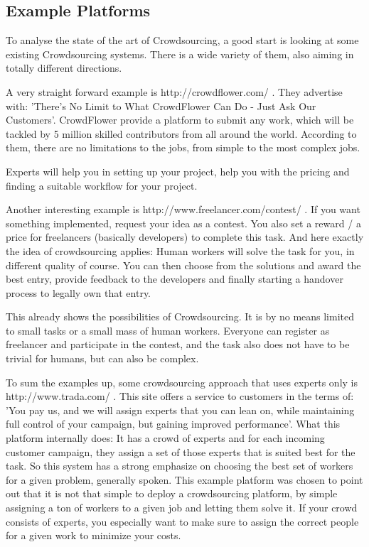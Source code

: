 \documentclass{sig-alternate}
\begin{document}
\subsection{Example Platforms}

To analyse the state of the art of Crowdsourcing, a good start is looking at some existing Crowdsourcing systems.
There is a wide variety of them, also aiming in totally different directions.

A very straight forward example is http://crowdflower.com/ .
They advertise with: 'There's No Limit to What CrowdFlower Can Do - Just Ask Our Customers'.
CrowdFlower provide a platform to submit any work, which will be tackled by 5 million skilled contributors from all around the world.
According to them, there are no limitations to the jobs, from simple to the most complex jobs.

Experts will help you in setting up your project, help you with the pricing and finding a suitable workflow for your project.

Another interesting example is http://www.freelancer.com/contest/ .
If you want something implemented, request your idea as a contest. You also set a reward / a price for freelancers (basically developers) to complete this task.
And here exactly the idea of crowdsourcing applies: Human workers will solve the task for you, in different quality of course. You can then choose
from the solutions and award the best entry, provide feedback to the developers and finally starting a handover process to legally own that entry.

This already shows the possibilities of Crowdsourcing. It is by no means limited to small tasks or a small mass of human workers.
Everyone can register as freelancer and participate in the contest, and the task also does not have to be trivial for humans, but can also be complex.


To sum the examples up, some crowdsourcing approach that uses experts only is http://www.trada.com/ .
This site offers a service to customers in the terms of: 'You pay us, and we will assign experts that you can lean on, while maintaining full control of your campaign, but gaining
improved performance'. What this platform internally does: It has a crowd of experts and for each incoming customer campaign, they assign a set of those experts that is suited best
for the task. So this system has a strong emphasize on choosing the best set of workers for a given problem, generally spoken. 
This example platform was chosen to point out that it is not that simple to deploy a crowdsourcing platform, by simple assigning a ton of workers to a given job and letting them solve it.
If your crowd consists of experts, you especially want to make sure to assign the correct people for a given work to minimize your costs.
\end{document}
